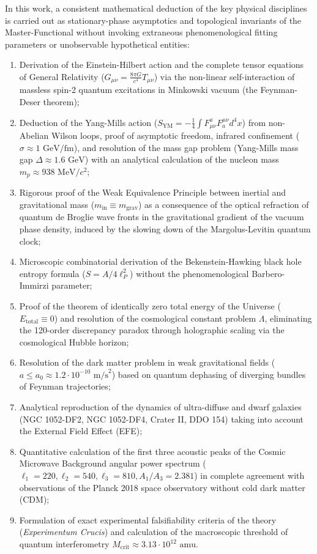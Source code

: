 \documentclass[11pt,a4paper]{article}
\theoremstyle{definition}
\begin{document}
In this work, a consistent mathematical deduction of the key physical disciplines is carried out as stationary-phase asymptotics and topological invariants of the Master-Functional without invoking extraneous phenomenological fitting parameters or unobservable hypothetical entities:
\begin{enumerate}
\item Derivation of the Einstein-Hilbert action and the complete tensor equations of General Relativity ($G_{\mu\nu} = \frac{8\pi G}{c^4}T_{\mu\nu}$) via the non-linear self-interaction of massless spin-2 quantum excitations in Minkowski vacuum (the Feynman-Deser theorem);
\item Deduction of the Yang-Mills action ($S_{\text{YM}} = -\frac{1}{4}\int F_{\mu\nu}^a F^{\mu\nu}_a d^4x$) from non-Abelian Wilson loops, proof of asymptotic freedom, infrared confinement ($\sigma \approx 1\text{ GeV/fm}$), and resolution of the mass gap problem (Yang-Mills mass gap $\Delta \approx 1.6\text{ GeV}$) with an analytical calculation of the nucleon mass $m_p \approx 938\text{ MeV}/c^2$;
\item Rigorous proof of the Weak Equivalence Principle between inertial and gravitational mass ($m_{\text{in}} \equiv m_{\text{grav}}$) as a consequence of the optical refraction of quantum de Broglie wave fronts in the gravitational gradient of the vacuum phase density, induced by the slowing down of the Margolus-Levitin quantum clock;
\item Microscopic combinatorial derivation of the Bekenstein-Hawking black hole entropy formula ($S = A / 4\ell_P^2$) without the phenomenological Barbero-Immirzi parameter;
\item Proof of the theorem of identically zero total energy of the Universe ($E_{\text{total}} \equiv 0$) and resolution of the cosmological constant problem $\Lambda$, eliminating the 120-order discrepancy paradox through holographic scaling via the cosmological Hubble horizon;
\item Resolution of the dark matter problem in weak gravitational fields ($a \le a_0 \approx 1.2 \cdot 10^{-10}\text{ m/s}^2$) based on quantum dephasing of diverging bundles of Feynman trajectories;
\item Analytical reproduction of the dynamics of ultra-diffuse and dwarf galaxies (NGC 1052-DF2, NGC 1052-DF4, Crater II, DDO 154) taking into account the External Field Effect (EFE);
\item Quantitative calculation of the first three acoustic peaks of the Cosmic Microwave Background angular power spectrum ($\ell_1=220, \ell_2=540, \ell_3=810, A_1/A_3=2.381$) in complete agreement with observations of the Planck 2018 space observatory without cold dark matter (CDM);
\item Formulation of exact experimental falsifiability criteria of the theory (\textit{Experimentum Crucis}) and calculation of the macroscopic threshold of quantum interferometry $M_{\text{crit}} \approx 3.13 \cdot 10^{12}\text{ amu}$.
\end{enumerate}
\end{document}
